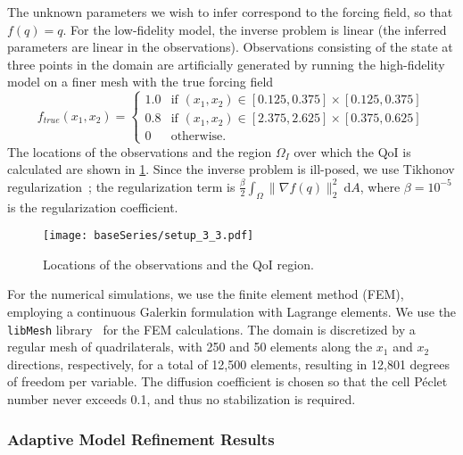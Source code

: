 The unknown parameters we wish to infer correspond to the forcing field, so that $f(q)=q$. For the low-fidelity model, the inverse problem is linear (the inferred parameters are linear in the observations). Observations consisting of the state at three points in the domain are artificially generated by running the high-fidelity model on a finer mesh with the true forcing field
%
\begin{equation}
f_{true}(x_1,x_2)=
\begin{cases}
1.0 & \textrm{if }(x_1,x_2)\in[0.125,0.375]\times[0.125,0.375] \\
0.8 & \textrm{if }(x_1,x_2)\in[2.375,2.625]\times[0.375,0.625] \\
0 & \textrm{otherwise}.
\end{cases}
\end{equation}
%
The locations of the observations and the region $\Omega_I$ over which the QoI is calculated are shown in \cref{fig:baseSetup}. Since the inverse problem is ill-posed, we use Tikhonov regularization~\cite{EngHanNeu00}; the regularization term is $\frac{\beta}{2}\int_\Omega \|\nabla f(q)\|_2^2\:\textrm{d}A$, where $\beta=10^{-5}$ is the regularization coefficient. 
%
\begin{figure}[htbp]
\centering
\texttt{[image: baseSeries/setup\_3\_3.pdf]}
\caption{Locations of the observations and the QoI region.}
\label{fig:baseSetup}
\end{figure}
%

For the numerical simulations, we use the finite element method (FEM), employing a continuous Galerkin formulation with Lagrange elements. We use the \texttt{libMesh} library~\cite{libMeshPaper} for the FEM calculations. 
The domain is discretized by a regular mesh of quadrilaterals, with 250 and 50 elements along the $x_1$ and $x_2$ directions, respectively, for a total of 12,500 elements, resulting in 12,801 degrees of freedom per variable. The diffusion coefficient is chosen so that the cell P\'{e}clet number never exceeds 0.1, and thus no stabilization is required.
%
\subsubsection{Adaptive Model Refinement Results} \label{sec:cdvcdrBaseRef} 
%

